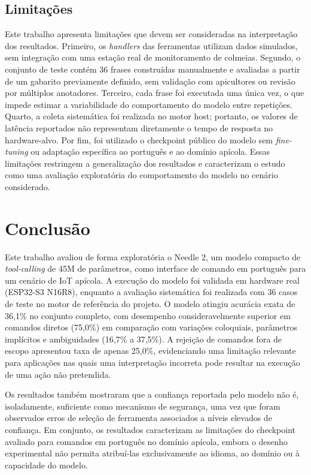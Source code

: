 \documentclass[12pt]{article}
\begin{document}
\subsection{Limitações}

Este trabalho apresenta limitações que devem ser consideradas na
interpretação dos resultados. Primeiro, os \textit{handlers} das
ferramentas utilizam dados simulados, sem integração com uma estação real
de monitoramento de colmeias. Segundo, o conjunto de teste contém 36
frases construídas manualmente e avaliadas a partir de um gabarito
previamente definido, sem validação com apicultores ou revisão por
múltiplos anotadores. Terceiro, cada frase foi executada uma única vez, o
que impede estimar a variabilidade do comportamento do modelo entre
repetições. Quarto, a coleta sistemática foi realizada no motor host;
portanto, os valores de latência reportados não representam diretamente o
tempo de resposta no hardware-alvo. Por fim, foi utilizado o checkpoint
público do modelo sem \textit{fine-tuning} ou adaptação específica ao
português e ao domínio apícola. Essas limitações restringem a
generalização dos resultados e caracterizam o estudo como uma avaliação
exploratória do comportamento do modelo no cenário considerado.



\section{Conclusão}
\label{sec:conclusao}

Este trabalho avaliou de forma exploratória o Needle 2, um modelo compacto
de \textit{tool-calling} de 45M de parâmetros, como interface de comando em português para um cenário de IoT apícola. A execução do modelo foi validada em hardware real (ESP32-S3 N16R8), enquanto a avaliação sistemática foi realizada com 36 casos de teste no motor de referência do projeto. O modelo atingiu acurácia exata de 36,1\% no conjunto completo, com desempenho consideravelmente superior em comandos diretos (75,0\%) em comparação com variações coloquiais, parâmetros implícitos e ambiguidades (16,7\% a 37,5\%). A rejeição de comandos fora de escopo apresentou taxa de apenas 25,0\%, evidenciando uma limitação relevante para aplicações nas quais uma interpretação incorreta pode resultar na execução de uma ação não pretendida.

Os resultados também mostraram que a confiança reportada pelo modelo não é, isoladamente, suficiente como mecanismo de segurança, uma vez que foram
observados erros de seleção de ferramenta associados a níveis elevados de
confiança. Em conjunto, os resultados caracterizam as limitações do
checkpoint avaliado para comandos em português no domínio apícola, embora
o desenho experimental não permita atribuí-las exclusivamente ao idioma,
ao domínio ou à capacidade do modelo.
\end{document}
